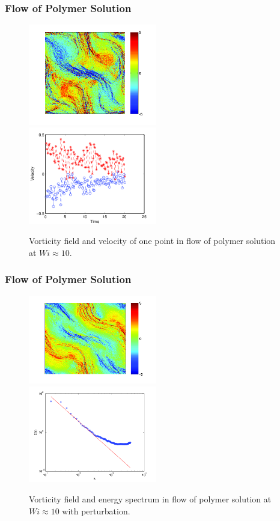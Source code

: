 \begin{frame}
  \frametitle{Flow of Polymer Solution}
  \begin{figure}[ht]
    \centering
    \includegraphics[width=0.5\textwidth]{img/polymer_loc-14.png}
    \includegraphics[width=0.5\textwidth]{img/polymer_loc-8.png}
    \caption{Vorticity field and velocity of one point in flow of polymer solution at $Wi\approx10$.}
    \label{fig:vor_pol10}
  \end{figure}
\end{frame}

\begin{frame}
 \frametitle{Flow of Polymer Solution}
  \begin{figure}[t]
    \centering
    \includegraphics[width=0.5\textwidth]{img/polymer_loc-11.png}
 \includegraphics[width=0.5\textwidth]{img/polymer_loc-0.png}
    \caption{Vorticity field and energy spectrum in flow of polymer solution at $Wi\approx10$ with perturbation.}
    \label{fig:vor_per}
  \end{figure}

\end{frame}

